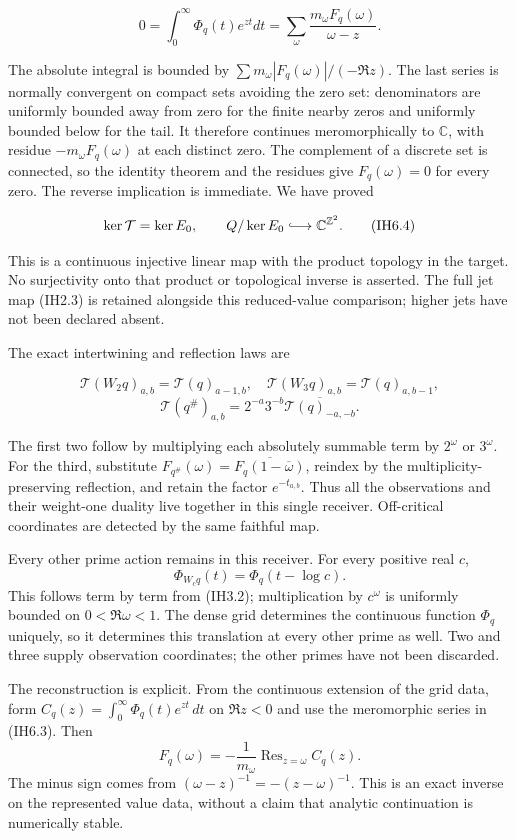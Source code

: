 \[
0=\int_0^\infty\Phi_q(t)e^{zt}dt
=\sum_\omega\frac{m_\omega F_q(\omega)}{\omega-z}.
\tag{IH6.3}
\]

The absolute integral is bounded by
\(\sum m_\omega|F_q(\omega)|/(-\Re z)\). The last series is normally
convergent on compact sets avoiding the zero set: denominators are
uniformly bounded away from zero for the finite nearby zeros and
uniformly bounded below for the tail. It therefore continues
meromorphically to \(\mathbb C\), with residue \(-m_\omega F_q(\omega)\)
at each distinct zero. The complement of a discrete set is connected, so
the identity theorem and the residues give \(F_q(\omega)=0\) for every
zero. The reverse implication is immediate. We have proved

\[
\ker\mathcal T=\ker E_0,\qquad
Q/\ker E_0\lhook\joinrel\longrightarrow\mathbb C^{\mathbb Z^2}.
\tag{IH6.4}
\]

This is a continuous injective linear map with the product topology in
the target. No surjectivity onto that product or topological inverse is
asserted. The full jet map (IH2.3) is retained alongside this
reduced-value comparison; higher jets have not been declared absent.

The exact intertwining and reflection laws are

\[
\mathcal T(W_2q)_{a,b}=\mathcal T(q)_{a-1,b},\quad
\mathcal T(W_3q)_{a,b}=\mathcal T(q)_{a,b-1},
\] \[
\mathcal T(q^\#)_{a,b}
=2^{-a}3^{-b}\overline{\mathcal T(q)_{-a,-b}}.
\tag{IH6.5}
\]

The first two follow by multiplying each absolutely summable term by
\(2^\omega\) or \(3^\omega\). For the third, substitute
\(F_{q^\#}(\omega)=\overline{F_q(1-\overline\omega)}\), reindex by the
multiplicity-preserving reflection, and retain the factor
\(e^{-t_{a,b}}\). Thus all the observations and their weight-one duality
live together in this single receiver. Off-critical coordinates are
detected by the same faithful map.

Every other prime action remains in this receiver. For every positive
real \(c\), \[
\Phi_{W_cq}(t)=\Phi_q(t-\log c).
\tag{IH6.6}
\] This follows term by term from (IH3.2); multiplication by
\(c^\omega\) is uniformly bounded on \(0<\Re\omega<1\). The dense grid
determines the continuous function \(\Phi_q\) uniquely, so it determines
this translation at every other prime as well. Two and three supply
observation coordinates; the other primes have not been discarded.

The reconstruction is explicit. From the continuous extension of the
grid data, form \(C_q(z)=\int_0^\infty\Phi_q(t)e^{zt}\,dt\) on
\(\Re z<0\) and use the meromorphic series in (IH6.3). Then \[
F_q(\omega)=-\frac{1}{m_\omega}\operatorname{Res}_{z=\omega}C_q(z).
\tag{IH6.7}
\] The minus sign comes from \((\omega-z)^{-1}=-(z-\omega)^{-1}\). This
is an exact inverse on the represented value data, without a claim that
analytic continuation is numerically stable.

